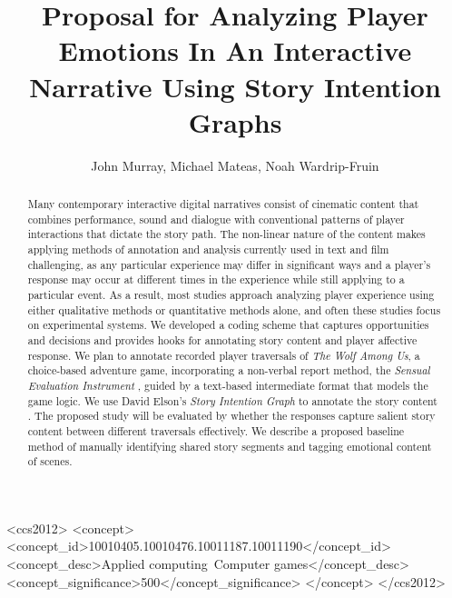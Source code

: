 \documentclass[sigconf]{acmart}
\begin{document}
\title{Proposal for Analyzing Player Emotions In An Interactive Narrative Using Story Intention Graphs}
\author{John Murray, Michael Mateas, Noah Wardrip-Fruin}

\begin{abstract}
Many contemporary interactive digital narratives consist of cinematic
content that combines performance, sound and dialogue with
conventional patterns of player interactions that dictate the story
path. The non-linear nature of the content makes applying methods of
annotation and analysis currently used in text and film challenging,
as any particular experience may differ in significant ways and a
player's response may occur at different times in the experience while
still applying to a particular event. As a result, most studies
approach analyzing player experience using either qualitative methods
or quantitative methods alone, and often these studies focus on
experimental systems. We developed a coding scheme that captures
opportunities and decisions and provides hooks for annotating story
content and player affective response. We plan to annotate recorded
player traversals of \emph{The Wolf Among Us}, a choice-based adventure
game, incorporating a non-verbal report method, the \emph{Sensual
Evaluation Instrument} \cite{Isbister2006-sc}, guided by a text-based
intermediate format that models the game logic. We use David Elson's
\emph{Story Intention Graph} to annotate the story content
\cite{Elson2012-pi}. The proposed study will be evaluated by whether
the responses capture salient story content between different
traversals effectively. We describe a proposed baseline method of
manually identifying shared story segments and tagging emotional
content of scenes.
\end{abstract}


%
%
\begin{CCSXML}
<ccs2012>
<concept>
<concept_id>10010405.10010476.10011187.10011190</concept_id>
<concept_desc>Applied computing~Computer games</concept_desc>
<concept_significance>500</concept_significance>
</concept>
</ccs2012>
\end{CCSXML}




\maketitle




 
\end{document}

